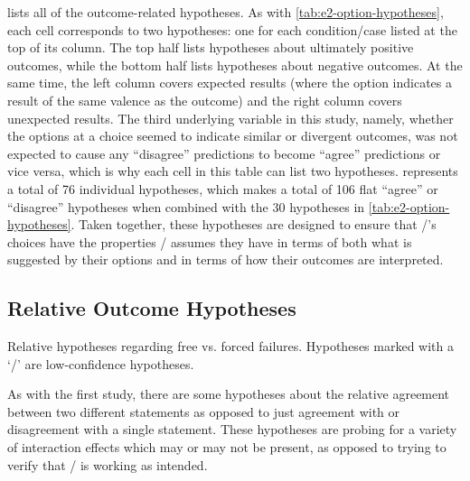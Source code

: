  lists all of the outcome-related hypotheses.
%
As with \cref{tab:e2-option-hypotheses}, each cell corresponds to two hypotheses: one for each condition/case listed at the top of its column.
%
The top half lists hypotheses about ultimately positive outcomes, while the bottom half lists hypotheses about negative outcomes.
%
At the same time, the left column covers expected results (where the option indicates a result of the same valence as the outcome) and the right column covers unexpected results.
%
The third underlying variable in this study, namely, whether the options at a choice seemed to indicate similar or divergent outcomes, was not expected to cause any ``disagree'' predictions to become ``agree'' predictions or vice versa, which is why each cell in this table can list two hypotheses.
%
 represents a total of 76 individual hypotheses, which makes a total of 106 flat ``agree'' or ``disagree'' hypotheses when combined with the 30 hypotheses in \cref{tab:e2-option-hypotheses}.
%
Taken together, these hypotheses are designed to ensure that \dunyazad/'s choices have the properties \dunyazad/ assumes they have in terms of both what is suggested by their options and in terms of how their outcomes are interpreted.

\subsection{Relative Outcome Hypotheses}
\label{sec:e2-relative-outcome-hypotheses}

\begin{table}[tb]
\centering
\bgroup
\def\arraystretch{1.3}
\setlength{\tabcolsep}{0.6em}

\egroup
\caption[Retrospective free vs\@. forced failure hypotheses]{Relative hypotheses regarding free vs\@. forced failures. Hypotheses marked with a `\lc/' are low-confidence hypotheses.}
  \label{tab:e2-free-vs-forced-failure-hypotheses}
\end{table}

As with the first study, there are some hypotheses about the relative agreement between two different statements as opposed to just agreement with or disagreement with a single statement.
%
These hypotheses are probing for a variety of interaction effects which may or may not be present, as opposed to trying to verify that \dunyazad/ is working as intended.


